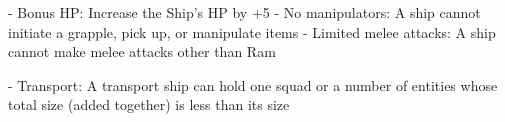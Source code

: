     -    Bonus HP: Increase the Ship’s HP by +5  
    -    No manipulators: A ship cannot initiate a grapple, pick up, or manipulate items  
    -    Limited melee attacks: A ship cannot make melee attacks other than Ram
 

                                                                                                            


-   Transport: A transport ship can hold one squad or a number of entities whose total size  
    (added together) is less than its size  

                                                                                                       
